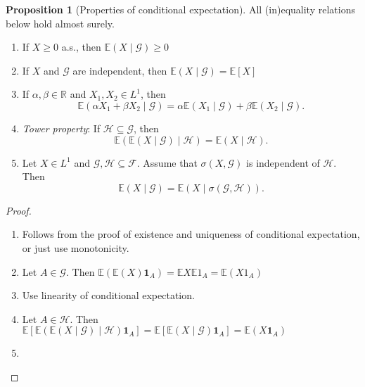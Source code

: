 \documentclass[parskip=full]{article}
\theoremstyle{definition}
\newtheorem*{proposition}{Proposition}
\newcommand{\R}{\mathbb{R}}
\newcommand{\1}{\mathbbm{1}}
\newcommand{\E}{\mathbb{E}}
\begin{document}
\begin{proposition}[Properties of conditional expectation]
    All (in)equality relations below hold almost surely.
    \begin{enumerate}
      \item If $X \geq 0$ a.s., then $\E(X \mid \mathcal{G}) \geq 0$
      \item If $X$ and $\mathcal{G}$ are independent, then $\E(X \mid \mathcal{G}) = \E[X]$
      \item If $\alpha, \beta \in \R$ and $X_1, X_2 \in L^1$, then
        \[
          \E(\alpha X_1 + \beta X_2 \mid \mathcal{G}) = \alpha \E(X_1 \mid\mathcal{G}) + \beta \E(X_2 \mid \mathcal{G}).
        \]
      \item \emph{Tower property}: If $\mathcal{H} \subseteq \mathcal{G}$, then
        \[
          \E(\E(X \mid \mathcal{G}) \mid \mathcal{H}) = \E(X \mid \mathcal{H}).
        \]
      \item Let $X \in L^1$ and $\mathcal{G}, \mathcal{H} \subseteq \mathcal{F}$. Assume that $\sigma(X, \mathcal{G})$ is independent of $\mathcal{H}$. Then
        \[
          \E (X \mid \mathcal{G}) = \E(X \mid \sigma(\mathcal{G}, \mathcal{H})).
        \]
    \end{enumerate}
  \end{proposition}

\begin{proof}
    \begin{enumerate}
        \item Follows from the proof of existence and uniqueness of conditional expectation, or just use monotonicity.
        \item Let $A \in \mathcal{G}$. Then $\E( \E(X) \mathbf{1}_A) = \E X \E 1_A = \E (X 1_A)$
        \item Use linearity of conditional expectation.
        \item Let $A \in \mathcal{H}$. Then $\E\left[\E(\E(X \mid \mathcal{G}) \mid \mathcal{H}) \mathbf{1}_A \right] = \E [\E(X \mid \mathcal{G}) \mathbf{1}_A] = \E(X \mathbf{1}_A)$
        \item 
    \end{enumerate}
\end{proof}
\end{document}
